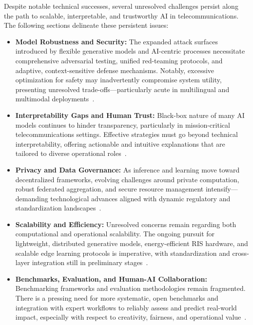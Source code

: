 Despite notable technical successes, several unresolved challenges persist along the path to scalable, interpretable, and trustworthy AI in telecommunications. The following sections delineate these persistent issues:

\begin{itemize}
    \item \textbf{Model Robustness and Security:} The expanded attack surfaces introduced by flexible generative models and AI-centric processes necessitate comprehensive adversarial testing, unified red-teaming protocols, and adaptive, context-sensitive defense mechanisms. Notably, excessive optimization for safety may inadvertently compromise system utility, presenting unresolved trade-offs—particularly acute in multilingual and multimodal deployments~\cite{ref7, ref8, ref9, ref10, ref11, ref12}.
    \item \textbf{Interpretability Gaps and Human Trust:} Black-box nature of many AI models continues to hinder transparency, particularly in mission-critical telecommunications settings. Effective strategies must go beyond technical interpretability, offering actionable and intuitive explanations that are tailored to diverse operational roles~\cite{ref43, ref44, ref45, ref46, ref47, ref48, ref49}.
    \item \textbf{Privacy and Data Governance:} As inference and learning move toward decentralized frameworks, evolving challenges around private computation, robust federated aggregation, and secure resource management intensify—demanding technological advances aligned with dynamic regulatory and standardization landscapes~\cite{ref24, ref25, ref26, ref27, ref38, ref39, ref40}.
    \item \textbf{Scalability and Efficiency:} Unresolved concerns remain regarding both computational and operational scalability. The ongoing pursuit for lightweight, distributed generative models, energy-efficient RIS hardware, and scalable edge learning protocols is imperative, with standardization and cross-layer integration still in preliminary stages~\cite{ref28, ref31, ref32, ref33, ref34, ref35, ref36}.
    \item \textbf{Benchmarks, Evaluation, and Human-AI Collaboration:} Benchmarking frameworks and evaluation methodologies remain fragmented. There is a pressing need for more systematic, open benchmarks and integration with expert workflows to reliably assess and predict real-world impact, especially with respect to creativity, fairness, and operational value~\cite{ref6, ref13, ref19}.
\end{itemize}

